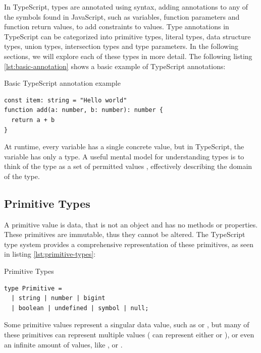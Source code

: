 In TypeScript, types are annotated using  syntax, adding annotations to any of the symbols found in JavaScript, such as variables, function parameters and function return values, to add constraints to values. Type annotations in TypeScript can be categorized into primitive types, literal types, data structure types, union types, intersection types and type parameters. In the following sections, we will explore each of these types in more detail. The following listing \ref{lst:basic-annotation} shows a basic example of TypeScript annotations:

\begin{listing}[h]
  \caption{Basic TypeScript annotation example}\label{lst:basic-annotation}
  \begin{verbatim}
const item: string = "Hello world"
function add(a: number, b: number): number {
  return a + b
}
\end{verbatim}
\end{listing}

At runtime, every variable has a single concrete value, but in TypeScript, the variable has only a type. A useful mental model for understanding types is to think of the type as a set of permitted values \cite{vanderkamEffectiveTypeScript622019}, effectively describing the domain of the type.

\subsection{Primitive Types}

A primitive value is data, that is not an object and has no methods or properties. These primitives are immutable, thus they cannot be altered. The TypeScript type system provides a comprehensive representation of these primitives, as seen in listing \ref{lst:primitive-types}:

\begin{listing}[h]
  \caption{Primitive Types}\label{lst:primitive-types}
  \begin{verbatim}
type Primitive = 
  | string | number | bigint
  | boolean | undefined | symbol | null;
\end{verbatim}
\end{listing}

Some primitive values represent a singular data value, such as  or , but many of these primitives can represent multiple values ( can represent either  or ), or even an infinite amount of values, like ,  or .

